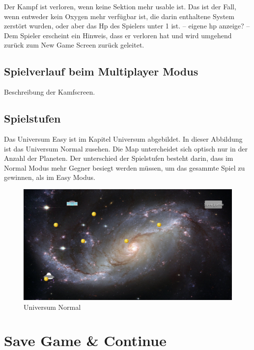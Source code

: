 \documentclass[fontsize=12pt,paper=a4,twoside]{scrartcl}
\begin{document}
Der Kampf ist verloren, wenn keine Sektion mehr usable ist. Das ist der Fall, wenn entweder kein Oxygen mehr verfügbar ist, die darin enthaltene System zerstört wurden, oder aber das Hp des Spielers unter 1 ist.
-- eigene hp anzeige? --
Dem Spieler erscheint ein Hinweis, dass er verloren hat und wird umgehend zurück zum New Game Screen
zurück geleitet.\\


\subsection{Spielverlauf beim Multiplayer Modus}
Beschreibung der Kamfscreen.

\subsection{Spielstufen}

Das Universum Easy ist im Kapitel Universum abgebildet. In dieser Abbildung ist das Universum Normal zusehen. Die Map untercheidet sich optisch nur in der Anzahl der Planeten.
Der unterschied der Spielstufen besteht darin, dass im Normal Modus mehr Gegner besiegt werden müssen, 
um das gesammte Spiel zu gewinnen, als im Easy Modus.

\begin{figure}[htp]
	\centering
	\includegraphics[width=1.00\linewidth]{pics/universumNormal.png}
	\caption{Universum Normal}
	\label{fig1}
\end{figure}



\section{Save Game \& Continue}
\end{document}
